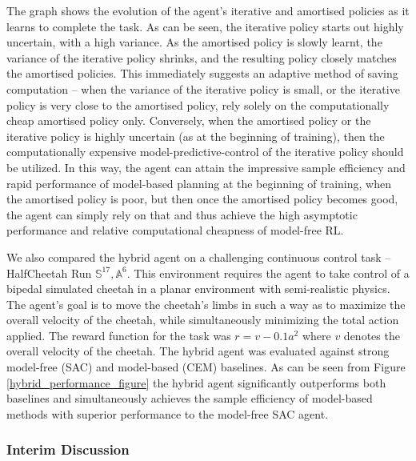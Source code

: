 The graph shows the evolution of the agent's iterative and amortised policies as it learns to complete the task. As can be seen, the iterative policy starts out highly uncertain, with a high variance. As the amortised policy is slowly learnt, the variance of the iterative policy shrinks, and the resulting policy closely matches the amortised policies. This immediately suggests an adaptive method of saving computation -- when the variance of the iterative policy is small, or the iterative policy is very close to the amortised policy, rely solely on the computationally cheap amortised policy only. Conversely, when the amortised policy or the iterative policy is highly uncertain (as at the beginning of training), then the computationally expensive model-predictive-control of the iterative policy should be utilized. In this way, the agent can attain the impressive sample efficiency and rapid performance of model-based planning at the beginning of training, when the amortised policy is poor, but then once the amortised policy becomes good, the agent can simply rely on that and thus achieve the high asymptotic performance and relative computational cheapness of model-free RL.

We also compared the hybrid agent on a challenging continuous control task -- HalfCheetah Run $\mathbb{S}^{17}, \mathbb{A}^6$. This environment requires the agent to take control of a bipedal simulated cheetah in a planar environment with semi-realistic physics. The agent's goal is to move the cheetah's limbs in such a way as to maximize the overall velocity of the cheetah, while simultaneously minimizing the total action applied. The reward function for the task was $r = v - 0.1a^2$ where $v$ denotes the overall velocity of the cheetah. The hybrid agent was evaluated against strong model-free (SAC) and model-based (CEM) baselines. As can be seen from Figure \ref{hybrid_performance_figure} the hybrid agent significantly outperforms both baselines and simultaneously achieves the sample efficiency of model-based methods with superior performance to the model-free SAC agent.

\subsubsection{Interim Discussion}

